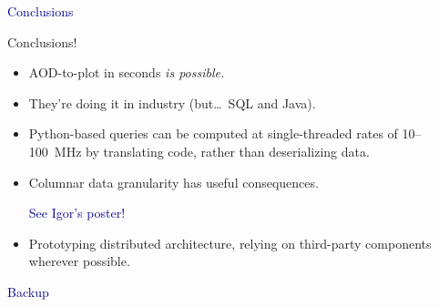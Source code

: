 \documentclass{beamer}
\begin{document}
\begin{frame}
\begin{center}
\huge \textcolor{darkblue}{Conclusions}
\end{center}
\end{frame}

\begin{frame}{Conclusions!}
\vspace{0.5 cm}

\begin{itemize}\setlength{\itemsep}{0.5 cm}
\item AOD-to-plot in seconds {\it is possible.}
\item They're doing it in industry (but\ldots\ SQL and Java).
\item Python-based queries can be computed at single-threaded rates of 10--100~MHz by translating code, rather than deserializing data.
\item Columnar data granularity has useful consequences.

\vspace{0.2 cm}
\textcolor{darkblue}{\normalsize See Igor's poster!}

\item Prototyping distributed architecture, relying on third-party components wherever possible.
\end{itemize}
\end{frame}

\begin{frame}
\begin{center}
\huge \textcolor{darkblue}{Backup}
\end{center}
\end{frame}
\end{document}
